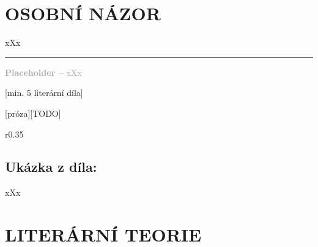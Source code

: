 \documentclass{extarticle} %
\begin{document}





\section*{OSOBNÍ NÁZOR}
\noindent 
xXx

\vfill

\noindent\begin{minipage}{\textwidth}
    \textcolor{darkgray}{\rule{\linewidth}{0.4pt}
    \footnotesize
    \textbf{Placeholder --} xXx
    }
\end{minipage}

\newpage

[min. 5 literární díla]


\changefontsize{8pt}

[próza][TODO]

\noindent\begin{wrapfigure}{r}{0.35\textwidth}
\tiny

\subsection*{Ukázka z díla:}
\setlength{\parindent}{3pt}
xXx
\end{wrapfigure}

\section*{LITERÁRNÍ TEORIE}
\end{document}
